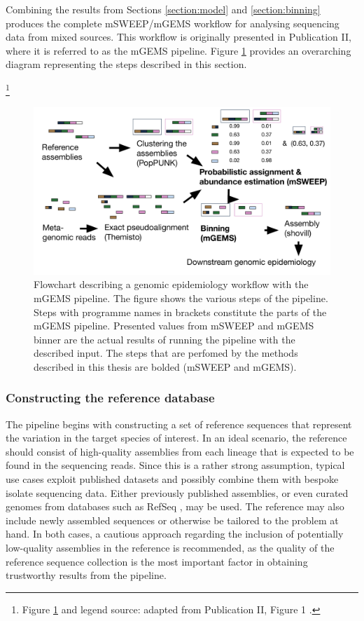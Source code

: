 \documentclass[officiallayout]{tktla}
\let\svthefootnote\thefootnote
\begin{document}
Combining the results from Sections \ref{section:model} and
\ref{section:binning} produces the complete mSWEEP/mGEMS workflow for
analysing sequencing data from mixed sources. This workflow is
originally presented in Publication II, where it is referred to as the
mGEMS pipeline. Figure \ref{fig:mgems-pipeline} provides an overarching
diagram representing the steps described in this section.

\noindent\let\thefootnote\relax\footnote{Figure \ref{fig:mgems-pipeline} and legend source: adapted from Publication II, Figure 1 \citep{maklin_bacterial_2021}.}
\addtocounter{footnote}{-1}\let\thefootnote\svthefootnote
\begin{figure}[!hb]
    \centering
    \includegraphics[width=\textwidth,keepaspectratio]{img/reproduced/MGen2021_mGEMS_Figure_1.pdf}
    \caption{Flowchart describing a genomic epidemiology workflow with
      the mGEMS pipeline. The figure shows the various steps of the
      pipeline. Steps with programme names in brackets constitute the
      parts of the mGEMS pipeline. Presented values from mSWEEP and
      mGEMS binner are the actual results of running the pipeline with
      the described input. The steps that are perfomed by the methods
      described in this thesis are bolded (mSWEEP and mGEMS).}
    \label{fig:mgems-pipeline}
\end{figure}

\subsubsection{Constructing the reference database}

The pipeline begins with constructing a set of reference sequences
that represent the variation in the target species of interest. In an
ideal scenario, the reference should consist of high-quality
assemblies from each lineage that is expected to be found in the
sequencing reads. Since this is a rather strong assumption, typical
use cases exploit published datasets and possibly combine them with
bespoke isolate sequencing data. Either previously published
assemblies, or even curated genomes from databases such as RefSeq
\citep{pruitt2007ncbi}, may be used. The reference may also include
  newly assembled sequences or otherwise be tailored to the problem at
  hand. In both cases, a cautious approach regarding the inclusion of
  potentially low-quality assemblies in the reference is recommended,
  as the quality of the reference sequence collection is the most
  important factor in obtaining trustworthy results from the pipeline.
\end{document}
